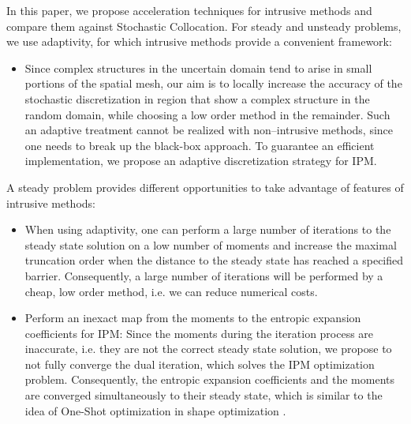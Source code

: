 In this paper, we propose acceleration techniques for intrusive methods and compare them against Stochastic Collocation. For steady and unsteady problems, we use adaptivity, for which intrusive methods provide a convenient framework: %
\begin{itemize}
\item Since complex structures in the uncertain domain tend to arise in small portions of the spatial mesh, our aim is to locally increase the accuracy of the stochastic discretization in region that show a complex structure in the random domain, while choosing a low order method in the remainder. Such an adaptive treatment cannot be realized with non--intrusive methods, since one needs to break up the black-box approach. To guarantee an efficient implementation, we propose an adaptive discretization strategy for IPM.
\end{itemize}
A steady problem provides different opportunities to take advantage of features of intrusive methods: 
\begin{itemize}
\item When using adaptivity, one can perform a large number of iterations to the steady state solution on a low number of moments and increase the maximal truncation order when the distance to the steady state has reached a specified barrier. Consequently, a large number of iterations will be performed by a cheap, low order method, i.e. we can reduce numerical costs. 
\item Perform an inexact map from the moments to the entropic expansion coefficients for IPM: Since the moments during the iteration process are inaccurate, i.e. they are not the correct steady state solution, we propose to not fully converge the dual iteration, which solves the IPM optimization problem. Consequently, the entropic expansion coefficients and the moments are converged simultaneously to their steady state, which is similar to the idea of One-Shot optimization in shape optimization \cite{hazra2005aerodynamic}.
\end{itemize}

